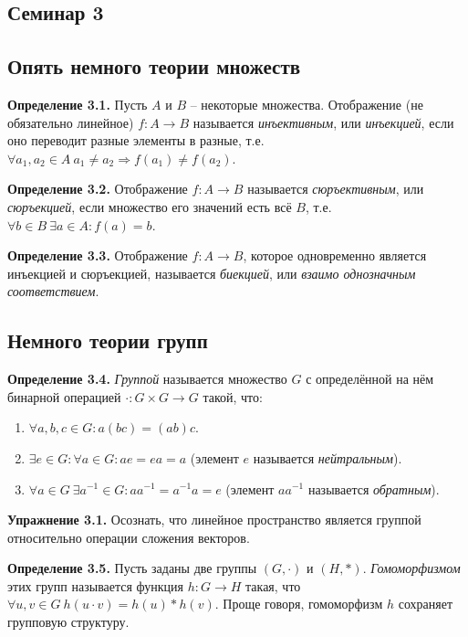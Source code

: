\documentclass[a4paper, 12pt]{article}
\begin{document}
\begin{spacing}{1.5}
\setlength{\parindent}{0ex}

\section*{Семинар 3}


\subsection*{Опять немного теории множеств}

\textbf{Определение 3.1.} Пусть $A$ и $B$ -- некоторые множества. Отображение (не обязательно линейное) $f: A \rightarrow B$ называется \textit{инъективным}, или \textit{инъекцией}, если оно переводит разные элементы в разные, т.е. $\forall a_1, a_2 \in A \ a_1 \neq a_2 \Rightarrow f(a_1) \neq f(a_2)$.

\textbf{Определение 3.2.} Отображение $f: A \rightarrow B$ называется \textit{сюръективным}, или \textit{сюръекцией}, если множество его значений есть всё $B$, т.е. $\forall b \in B \ \exists a \in A: f(a) = b$.

\textbf{Определение 3.3.} Отображение $f: A \rightarrow B$, которое одновременно является инъекцией и сюръекцией, называется \textit{биекцией}, или  \textit{взаимо однозначным соответствием}.


\subsection*{Немного теории групп}

\textbf{Определение 3.4.} \textit{Группой} называется множество $G$ с определённой на нём бинарной операцией $\cdot : G \times G \rightarrow G$ такой, что:
\begin{enumerate}[noitemsep]
    \item $\forall a, b, c \in G: a(bc) = (ab)c$.
    \item $\exists e \in G: \forall a \in G: ae = ea = a$ (элемент $e$ называется \textit{нейтральным}).
    \item $\forall a \in G \ \exists a^{-1} \in G: aa^{-1} = a^{-1}a = e$ (элемент $aa^{-1}$ называется \textit{обратным}).
\end{enumerate}

\textbf{Упражнение 3.1.} Осознать, что линейное пространство является группой относительно операции сложения векторов. 

\textbf{Определение 3.5.} Пусть заданы две группы $(G, \cdot)$ и $(H, *)$. \textit{Гомоморфизмом} этих групп называется функция $h: G \rightarrow H$ такая, что $\forall u, v \in G \ h(u \cdot v) = h(u) * h(v)$. Проще говоря, гомоморфизм $h$ сохраняет групповую структуру.


\end{spacing}
\end{document}
